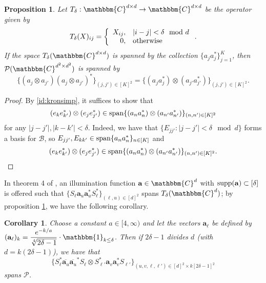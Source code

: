 \documentclass[]{spie}  %
\newtheorem{cor}{Corollary}
\newtheorem{prop}{Proposition}
\def \a {\mathbf a}
\def \bar {\overline}
\def \C {\mathbbm{C}}
\def \supp {{\rm supp}}
\def \Span {{\rm span}}
\begin{document}
\begin{prop}
  Let $T_\delta : \C^{d \times d} \to \C^{d \times d}$ be the operator given by $$T_\delta(X)_{ij} = \left\{\begin{array}{r@{,\quad}l}
  X_{ij} & |i - j| < \delta \mod d \\
  0 & \text{otherwise}\end{array}\right..$$
  If the space $T_{\delta}(\C^{d \times d})$ is spanned by the collection $\{a_j a_j^*\}_{j=1}^K$, then $\mathcal{P}(\C^{d^2 \times d^2})$ is spanned by $$\{(a_j \otimes a_{j'}) (a_j \otimes a_{j'})^*\}_{(j, j') \in [K]^2} = \{(a_j a_j^*) \otimes (a_{j'} a_{j'}^*)\}_{(j, j') \in [K]^2}.$$
  \label{prop:kronspan}
\end{prop}

\begin{proof}
  By \eqref{id:kronsimp}, it suffices to show that $$(e_k e_{k'}^*) \otimes (e_j e_{j'}^*) \in \Span\{(a_n a_n^*) \otimes (a_{n'} a_{n'}^*)\}_{(n, n') \in [K]^2}$$ for any $|j - j'|, |k - k'| < \delta$.  Indeed, we have that $\{E_{jj'} : |j - j'| < \delta \mod d\}$ forms a basis for $\mathcal{B}$, so $E_{j j'}, E_{k k'} \in \Span\{a_n a_n^*\}_{n \in [K]}$ and $$(e_k e_{k'}^*) \otimes (e_j e_{j'}^*) \in \Span\{(a_n a_n^*) \otimes (a_{n'} a_{n'}^*)\}_{(n, n') \in [K]^2}.$$
\end{proof}

In theorem 4 of \cite{iwen2016fast}, an illumination function $\a \in \C^d$ with $\supp(\a) \subset [\delta]$ is offered such that $\{S_\ell \a_u \a_u^* S_\ell^*\}_{(\ell, u) \in [d]^2}$ spans $T_\delta(\C^d)$; by proposition \ref{prop:kronspan}, we have the following corollary.

\begin{cor}
  Choose a constant $a \in [4, \infty)$ and let the vectors $\a_\ell$ be defined by $(\a_\ell)_k = \dfrac{e^{-k / a}}{\sqrt[4]{2 \delta - 1}} \cdot \mathbbm{1}_{k \le \delta}$.  Then if $2 \delta - 1$ divides $d$ (with $d = k(2 \delta - 1)$), we have that $$\{S_\ell^* \bar{\a_u} \bar{\a_u}^* S_\ell \otimes S_{\ell'}^* \a_v \a_v^* S_{\ell'}\}_{(u, v, \ell, \ell') \in [d]^2 \times k[2 \delta - 1]^2}$$ spans $\mathcal{P}$.
\end{cor}
\end{document}
